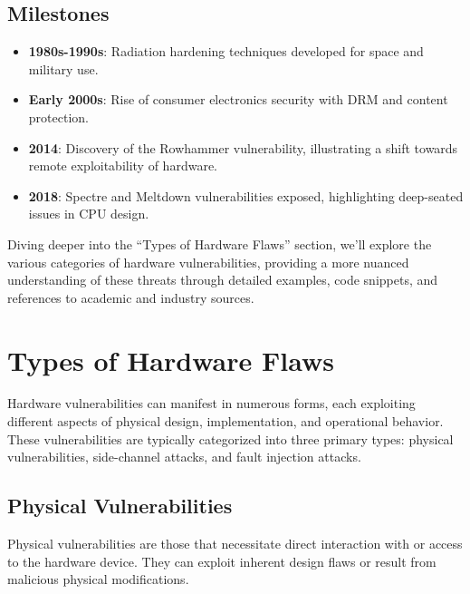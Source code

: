 \hypertarget{milestones}{%
\subsection{Milestones}\label{milestones}}

\begin{itemize}
\item
  \textbf{1980s-1990s}: Radiation hardening techniques developed for
  space and military use.
\item
  \textbf{Early 2000s}: Rise of consumer electronics security with DRM
  and content protection.
\item
  \textbf{2014}: Discovery of the Rowhammer vulnerability, illustrating
  a shift towards remote exploitability of hardware.
\item
  \textbf{2018}: Spectre and Meltdown vulnerabilities exposed,
  highlighting deep-seated issues in CPU design.
\end{itemize}

Diving deeper into the ``Types of Hardware Flaws'' section, we'll
explore the various categories of hardware vulnerabilities, providing a
more nuanced understanding of these threats through detailed examples,
code snippets, and references to academic and industry sources.

\hypertarget{types-of-hardware-flaws}{%
\section{Types of Hardware Flaws}\label{types-of-hardware-flaws}}

Hardware vulnerabilities can manifest in numerous forms, each exploiting
different aspects of physical design, implementation, and operational
behavior. These vulnerabilities are typically categorized into three
primary types: physical vulnerabilities, side-channel attacks, and fault
injection attacks.

\hypertarget{physical-vulnerabilities}{%
\subsection{Physical
Vulnerabilities}\label{physical-vulnerabilities}}

Physical vulnerabilities are those that necessitate direct interaction
with or access to the hardware device. They can exploit inherent design
flaws or result from malicious physical modifications.

